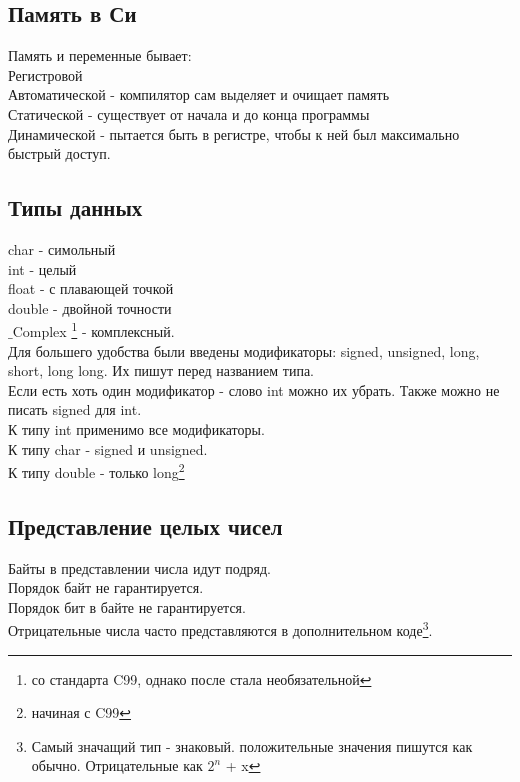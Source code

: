 \documentclass[a4paper,12pt]{article}
\begin{document}
\subsection{Память в Си}
Память и переменные бывает:\\
Регистровой\\
Автоматической - компилятор сам выделяет и очищает память\\
Статической - существует от начала и до конца программы\\
Динамической - пытается быть в регистре, чтобы к ней был максимально быстрый доступ.
\subsection{Типы данных}
char - симольный\\
int - целый\\
float - с плавающей точкой\\
double - двойной точности\\
$\_$Complex \footnote{со стандарта C99, однако после стала необязательной} - комплексный.\\ 
Для большего удобства были введены модификаторы: signed, unsigned, long, short, long long. Их пишут перед названием типа.\\
Если есть хоть один модификатор - слово int можно их убрать. Также можно не писать signed для int.\\
К типу int применимо все модификаторы. \\
К типу char - signed и unsigned.\\
К типу double - только long\footnote{начиная с C99}
\subsection{Представление целых чисел}
Байты в представлении числа идут подряд.\\
Порядок байт не гарантируется.\\
Порядок бит в байте не гарантируется.\\
Отрицательные числа часто представляются в дополнительном коде\footnote{Самый значащий тип - знаковый. положительные значения пишутся как обычно. Отрицательные как $2^n$ + x}. 
\end{document}
